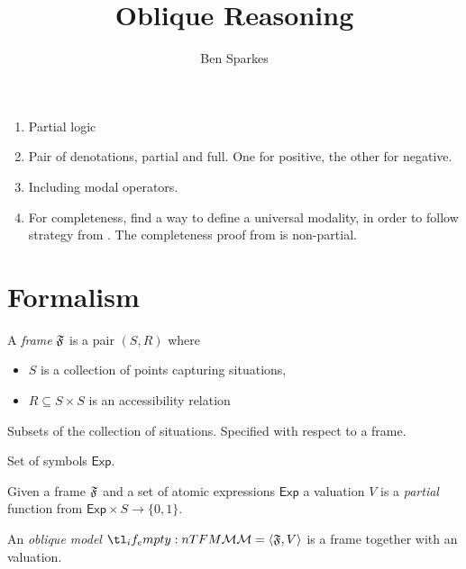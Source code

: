 \documentclass[10pt]{article}
\title{Oblique Reasoning}
\author{Ben Sparkes}
\begin{document}
\maketitle

\begin{enumerate}
\item Partial logic
\item Pair of denotations, partial and full.
  One for positive, the other for negative.
\item Including modal operators.
\item For completeness, find a way to define a universal modality, in order to follow strategy from \citeauthor{Gargov:1987aa}.
  The completeness proof from \citeauthor{Gargov:1987aa} is non-partial.
\end{enumerate}

\section{Formalism}
\label{sec:formalism}

\begin{definition}[Frame]
  A \emph{frame} \(\mathfrak{F}\) is a pair \((S, R)\) where
  \begin{itemize}
  \item \(S\) is a collection of points capturing situations,
  \item \(R \subseteq S \times S\) is an accessibility relation
  \end{itemize}
\end{definition}

\begin{definition}[Propositions]
  Subsets of the collection of situations.
  Specified with respect to a frame.
\end{definition}

\begin{definition}
  Set of symbols \(\mathsf{Exp}\).
\end{definition}

\begin{definition}[Valuation]
  Given a frame \(\mathfrak{F}\) and a set of atomic expressions \(\mathsf{Exp}\) a valuation \(V\) is a \emph{partial} function from \(\mathsf{Exp} \times S \to \{0, 1\}\).
\end{definition}

\begin{definition}[Model]
  An \emph{oblique model} \(\omodel{M} = \langle \oframe{F}, V \rangle\) is a frame together with an valuation.
\end{definition}
\end{document}
